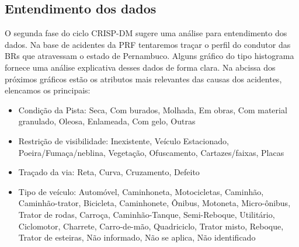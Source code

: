 \subsection{Entendimento dos dados}
O segunda fase do ciclo CRISP-DM sugere uma análise para entendimento dos dados.
Na base de acidentes da PRF tentaremos traçar o perfil do condutor das BRs que atravessam o estado de Pernambuco.
Alguns gráfico do tipo histograma fornece uma análise explicativa desses dados de forma clara.
Na abcissa dos próximos gráficos estão os atributos mais relevantes das causas dos acidentes, elencamos os principais:
\begin{itemize}
 \item Condição da Pista: {Seca, Com burados, Molhada, Em obras, Com material granulado, Oleosa, Enlameada, Com gelo, Outras}
 \item Restrição de visibilidade: {Inexistente, Veículo Estacionado, Poeira/Fumaça/neblina, Vegetação, Ofuscamento, Cartazes/faixas, Placas}
 \item Traçado da via: {Reta, Curva, Cruzamento, Defeito}
 \item Tipo de veículo: {Automóvel, Caminhoneta, Motocicletas, Caminhão, Caminhão-trator, Bicicleta, Caminhonete, Ônibus, Motoneta, Micro-ônibus, Trator
 de rodas, Carroça, Caminhão-Tanque, Semi-Reboque, Utilitário, Ciclomotor, Charrete, Carro-de-mão, Quadriciclo, Trator misto, Reboque, Trator de esteiras,
 Não informado, Não se aplica, Não identificado}
\end{itemize}


